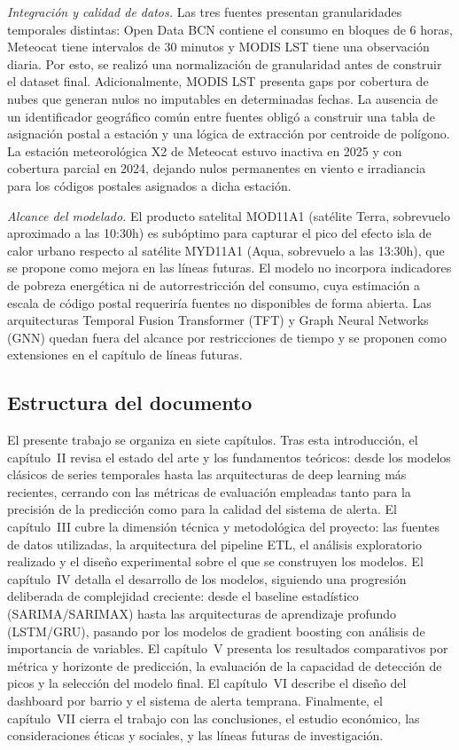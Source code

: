 \documentclass[12pt, a4paper]{article}
\begin{document}
\textit{Integración y calidad de datos.} Las tres fuentes presentan granularidades temporales distintas: Open Data BCN contiene el consumo en bloques de 6 horas, Meteocat tiene intervalos de 30 minutos y MODIS LST tiene una observación diaria. Por esto, se realizó una normalización de granularidad antes de construir el dataset final. Adicionalmente, MODIS LST presenta gaps por cobertura de nubes que generan nulos no imputables en determinadas fechas. La ausencia de un identificador geográfico común entre fuentes obligó a construir una tabla de asignación postal a estación y una lógica de extracción por centroide de polígono. La estación meteorológica X2 de Meteocat estuvo inactiva en 2025 y con cobertura parcial en 2024, dejando nulos permanentes en viento e irradiancia para los códigos postales asignados a dicha estación.

\textit{Alcance del modelado.} El producto satelital MOD11A1 (satélite Terra, sobrevuelo aproximado a las 10:30h) es subóptimo para capturar el pico del efecto isla de calor urbano respecto al satélite MYD11A1 (Aqua, sobrevuelo a las 13:30h), que se propone como mejora en las líneas futuras. El modelo no incorpora indicadores de pobreza energética ni de autorrestricción del consumo, cuya estimación a escala de código postal requeriría fuentes no disponibles de forma abierta. Las arquitecturas Temporal Fusion Transformer (TFT) y Graph Neural Networks (GNN) quedan fuera del alcance por restricciones de tiempo y se proponen como extensiones en el capítulo de líneas futuras.

\subsection{Estructura del documento}

El presente trabajo se organiza en siete capítulos. Tras esta introducción, el capítulo~II revisa el estado del arte y los fundamentos teóricos: desde los modelos clásicos de series temporales hasta las arquitecturas de deep learning más recientes, cerrando con las métricas de evaluación empleadas tanto para la precisión de la predicción como para la calidad del sistema de alerta. El capítulo~III cubre la dimensión técnica y metodológica del proyecto: las fuentes de datos utilizadas, la arquitectura del pipeline ETL, el análisis exploratorio realizado y el diseño experimental sobre el que se construyen los modelos. El capítulo~IV detalla el desarrollo de los modelos, siguiendo una progresión deliberada de complejidad creciente: desde el baseline estadístico (SARIMA/SARIMAX) hasta las arquitecturas de aprendizaje profundo (LSTM/GRU), pasando por los modelos de gradient boosting con análisis de importancia de variables. El capítulo~V presenta los resultados comparativos por métrica y horizonte de predicción, la evaluación de la capacidad de detección de picos y la selección del modelo final. El capítulo~VI describe el diseño del dashboard por barrio y el sistema de alerta temprana. Finalmente, el capítulo~VII cierra el trabajo con las conclusiones, el estudio económico, las consideraciones éticas y sociales, y las líneas futuras de investigación.
\end{document}
